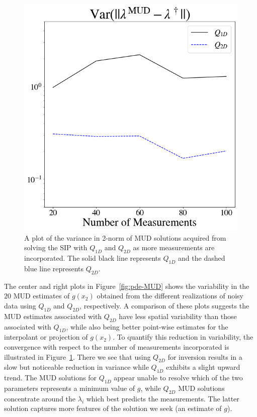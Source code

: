 \begin{figure}[htbp]
\centering
    \includegraphics[width=0.325\linewidth]{figures/pde-highd/pde-highd_convergence.png}
\caption{
A plot of the variance in 2-norm of MUD solutions acquired from solving the SIP with $Q_{1D}$ and $Q_{2D}$ as more measurements are incorporated.
The solid black line represents $Q_{1D}$ and the dashed blue line represents $Q_{2D}$.
}
\label{fig:pde-convergence}
\end{figure}


The center and right plots in Figure~\ref{fig:pde-MUD} shows the variability in the $20$ MUD estimates of $g(x_2)$ obtained from the different realizations of noisy data using $Q_{1D}$ and $Q_{2D}$, respectively.
A comparison of these plots suggests the MUD estimates associated with $Q_{2D}$ have less spatial variability than those associated with $Q_{1D}$, while also being better point-wise estimates for the interpolant or projection of $g(x_2)$.
To quantify this reduction in variability, the convergence with respect to the number of measurements incorporated is illustrated in Figure~\ref{fig:pde-convergence}.
There we see that using $Q_{2D}$ for inversion results in a slow but noticeable reduction in variance while $Q_{1D}$ exhibits a slight upward trend.
The MUD solutions for $Q_{1D}$ appear unable to resolve which of the two parameters represents a minimum value of $g$, while $Q_{2D}$ MUD solutions concentrate around the $\lambda_i$ which best predicts the measurements.
The latter solution captures more features of the solution we seek (an estimate of $g$).
